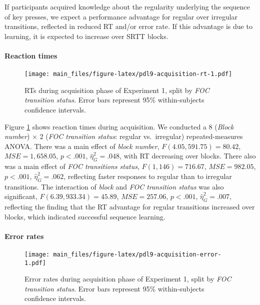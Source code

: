 \documentclass[english,,man]{apa6}
\begin{document}
If participants acquired knowledge about the regularity underlying the sequence of key presses, we expect a performance advantage for regular over irregular transitions, reflected in reduced RT and/or error rate.
If this advantage is due to learning, it is expected to increase over SRTT blocks.

\hypertarget{reaction-times}{%
\paragraph{Reaction times}\label{reaction-times}}

\begin{figure}
\centering
\texttt{[image: main\_files/figure-latex/pdl9-acquisition-rt-1.pdf]}
\caption{\label{fig:pdl9-acquisition-rt}RTs during acquisition phase of Experiment 1, split by \emph{FOC transition status}. Error bars represent 95\% within-subjects confidence intervals.}
\end{figure}

Figure \ref{fig:pdl9-acquisition-rt} shows reaction times during acquisition.
We conducted a 8 (\emph{Block number}) \(\times\) 2 (\emph{FOC transition status}: regular vs.~irregular) repeated-measures ANOVA.
There was a main effect of \emph{block number},
\(F(4.05, 591.75) = 80.42\), \(\mathit{MSE} = 1,658.05\), \(p < .001\), \(\hat{\eta}^2_G = .048\), with RT decreasing over blocks.
There also was a main effect of \emph{FOC transitions status},
\(F(1, 146) = 716.67\), \(\mathit{MSE} = 982.05\), \(p < .001\), \(\hat{\eta}^2_G = .062\),
reflecting faster responses to regular than to irregular transitions.
The interaction of \emph{block} and \emph{FOC transition status} was also significant,
\(F(6.39, 933.34) = 45.89\), \(\mathit{MSE} = 257.06\), \(p < .001\), \(\hat{\eta}^2_G = .007\), reflecting the finding that the RT advantage for regular transitions increased over blocks, which indicated successful sequence learning.

\hypertarget{error-rates}{%
\paragraph{Error rates}\label{error-rates}}

\begin{figure}
\centering
\texttt{[image: main\_files/figure-latex/pdl9-acquisition-error-1.pdf]}
\caption{\label{fig:pdl9-acquisition-error}Error rates during acquisition phase of Experiment 1, split by \emph{FOC transition status}. Error bars represent 95\% within-subjects confidence intervals.}
\end{figure}
\end{document}

